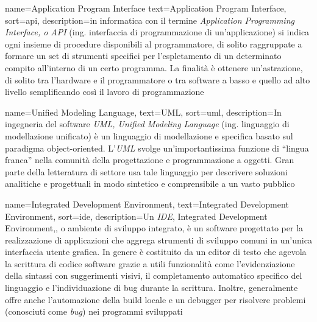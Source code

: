 



 {
    name=Application Program Interface
    text=Application Program Interface,
    sort=api,
    description={in informatica con il termine \emph{Application Programming Interface, o API} (ing. interfaccia di programmazione di un'applicazione) si indica ogni insieme di procedure disponibili al programmatore, di solito raggruppate a formare un set di strumenti specifici per l'espletamento di un determinato compito all'interno di un certo programma. La finalità è ottenere un'astrazione, di solito tra l'hardware e il programmatore o tra software a basso e quello ad alto livello semplificando così il lavoro di programmazione}
}

 {
    name=Unified Modeling Language,
    text=UML,
    sort=uml,
    description={In ingegneria del software \emph{UML, Unified Modeling Language} (ing. linguaggio di modellazione unificato) è un linguaggio di modellazione e specifica basato sul paradigma object-oriented. L'\emph{UML} svolge un'importantissima funzione di ``lingua franca'' nella comunità della progettazione e programmazione a oggetti. Gran parte della letteratura di settore usa tale linguaggio per descrivere soluzioni analitiche e progettuali in modo sintetico e comprensibile a un vasto pubblico}
}

 {
    name=Integrated Development Environment,
    text=Integrated Development Environment,
    sort=ide,
    description={Un \emph{IDE}, Integrated Development Environment,, o ambiente di sviluppo integrato, è un software progettato per la realizzazione di applicazioni che aggrega strumenti di sviluppo comuni in un'unica interfaccia utente grafica. In genere è costituito da un editor di testo che agevola la scrittura di codice software grazie a utili funzionalità come l'evidenziazione della sintassi con suggerimenti visivi, il completamento automatico specifico del linguaggio e l'individuazione di bug durante la scrittura. Inoltre, generalmente offre anche l'automazione della build locale e un debugger per risolvere problemi (conosciuti come \emph{bug}) nei programmi sviluppati}
}

